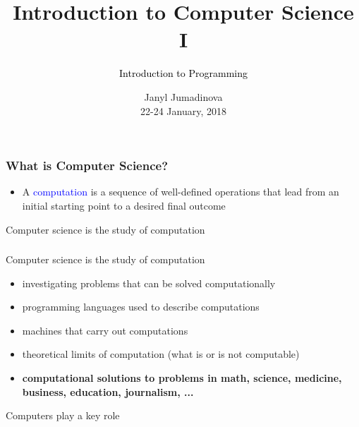 \documentclass{beamer}
\title{Introduction to Computer Science I}
\subtitle{\textcolor{black}{Introduction to Programming}}
\author{Janyl Jumadinova \\ 22-24 January, 2018}
\begin{document}
\begin{frame}
  \titlepage
\end{frame}

\begin{frame}
  \frametitle{What is Computer Science?}
	\begin{itemize}
		\item A \textcolor{blue}{computation} is a sequence of well-defined operations that lead from an initial starting point to a desired final outcome
    \end{itemize}
    \pause
    \begin{block}{\centering \Large{Computer science is the study of computation}}
    \end{block}
\end{frame}
\begin{frame}
  \frametitle{}
  Computer science is the study of computation
  \pause
  	\begin{itemize}
		\item investigating problems that can be solved computationally \pause
		\item programming languages used to describe computations \pause
		\item machines that carry out computations \pause
		\item theoretical limits of computation (what is or is not computable) \pause
		\item \textbf{computational solutions to problems in math, science, medicine,  business, education, journalism, ...} \pause
    \end{itemize}
    
Computers play a key role
\end{frame}
\end{document}
